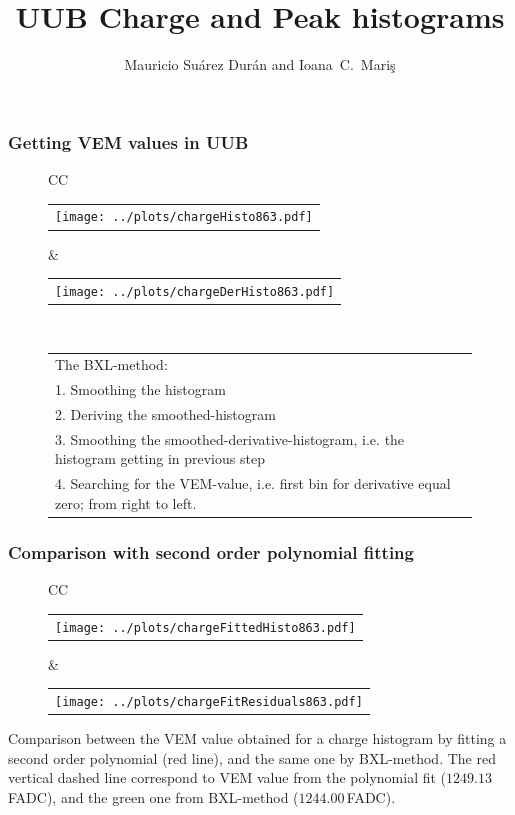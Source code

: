 \documentclass[aspectratio=169]{beamer}
\title{UUB Charge and Peak histograms}
\author{
  Mauricio Su\'arez Dur\'an and Ioana~C.~Mari\c{s}
}
\institute{IIHE-ULB}
\begin{document}
\begin{frame}
  \titlepage
\end{frame}

\begin{frame}
  \frametitle{Getting VEM values in UUB} %
  \begin{figure}
    \centering
    \begin{tabularx}{\textwidth}{CC}
      \begin{tabular}{l}
        \texttt{[image: ../plots/chargeHisto863.pdf]}
      \end{tabular}
      &
      \begin{tabular}{l}
        \texttt{[image: ../plots/chargeDerHisto863.pdf]}
      \end{tabular}
      \\
      \footnotesize
      \begin{tabular}{l}
        The BXL-method: \\
        1. Smoothing the histogram \\
        2. Deriving the smoothed-histogram \\
        3. Smoothing the smoothed-derivative-histogram, i.e. the
        histogram getting in previous step \\
        4. Searching for the VEM-value, i.e. first bin for
        derivative equal zero; from right to left. \\
      \end{tabular}
    \end{tabularx}
  \end{figure}
\end{frame}

\begin{frame} 
  \frametitle{Comparison with second order polynomial fitting}
  \begin{figure}
    \centering
    \begin{tabularx}{\textwidth}{CC}
      \begin{tabular}{l}
        \texttt{[image: ../plots/chargeFittedHisto863.pdf]}
      \end{tabular}
      &
      \begin{tabular}{l}
        \texttt{[image: ../plots/chargeFitResiduals863.pdf]}
      \end{tabular}
    \end{tabularx}
  \end{figure}
  Comparison between the VEM value obtained for a charge
  histogram by fitting a second order polynomial (red line), and
  the same one by BXL-method. The red vertical dashed line
  correspond to VEM value from the polynomial fit
  ($1249.13$\,FADC), and the green one from BXL-method
  ($1244.00$\,FADC).
\end{frame}
\end{document}
